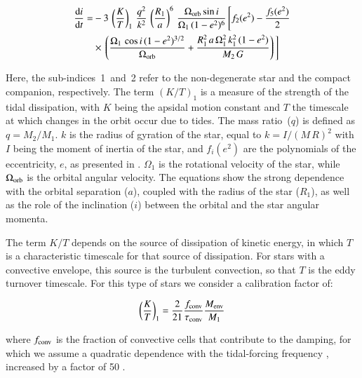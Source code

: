 \documentclass{aa}
\begin{document}
\begin{equation}\label{inclination-equation}
   \begin{aligned}
      \dfrac{{\rm d}i}{{\rm d}t} = &-3 \, \left( \dfrac{K}{T} \right)_1 \, \dfrac{q^2}{k^2} \, \left( \dfrac{R_1}{a} \right)^6 \, \dfrac{\Omega_{\rm orb} \sin i}{\Omega_1 \, (1 -
      e^2)^{6}} \, \Bigg[
      f_2(e^2) - \dfrac{f_5(e^2)}{2} \\
                                   &\times \, \left( \dfrac{\Omega_1 \, \cos i \, (1-e^2)^{3/2}}{\Omega_{\rm orb}} + \dfrac{R_1^2 \, a \, \Omega_1^2 \, k_1^2 \, (1-e^2)}{M_2 \, G}
                                \right) \Bigg]
   \end{aligned}
\end{equation}

Here, the sub-indices~1~and~2 refer to the non-degenerate star and the compact companion, respectively. The term $(K/T)_1$ is a measure of
the strength of the tidal dissipation, with $K$ being the apsidal motion constant and $T$ the timescale at which changes in the orbit occur
due to tides. The mass ratio~($q$) is defined as $q = M_2/M_1$. $k$ is the radius of gyration of the star, equal to $k = I / (M\,R)^2$ with
$I$ being the moment of inertia of the star, and $f_i(e^2)$ are the polynomials of the eccentricity, $e$, as presented in \citet{hut1981}.
$\Omega_1$ is the rotational velocity of the star, while $\Omega_{\rm orb}$ is the orbital angular velocity. The equations show the strong
dependence with the orbital separation ($a$), coupled with the radius of the star ($R_1$), as well as the role of the inclination ($i$)
between the orbital and the star angular momenta.

The term $K/T$ depends on the source of dissipation of kinetic energy, in which $T$ is a characteristic timescale for that source of
dissipation. For stars with a convective envelope, this source is the turbulent convection, so that $T$ is the eddy turnover timescale. For
this type of stars we consider a calibration factor of:

\begin{equation}
   \left( \dfrac{K}{T} \right)_1 = \dfrac{2}{21} \dfrac{f_{\rm conv}}{\tau_{\rm conv}} \dfrac{M_{\rm env}}{M_1}
\end{equation}

{\noindent where $f_{\rm conv}$ is the fraction of convective cells that contribute to the damping, for which we assume a quadratic
dependence with the tidal-forcing frequency \citep{goldreich1977}, increased by a factor of 50 \citep{belczynski2008}.}
\end{document}
